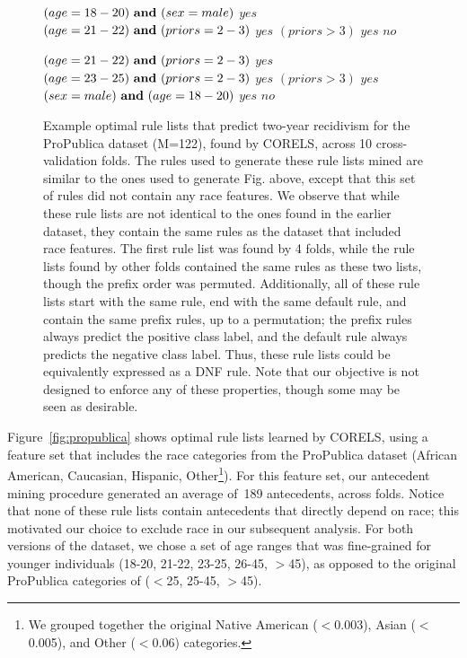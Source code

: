 \begin{figure}[hb!]
\vspace{1mm}
\begin{algorithmic}
\State \bif $(age = 18-20){\bf ~and~} (sex = male)$ \bthen $yes$
\State \belif $(age = 21-22) {\bf ~and~} (priors = 2-3)$ \bthen $yes$
\State \belif $(priors > 3)$ \bthen $yes$
\State \belse $no$
\end{algorithmic}
\vspace{1mm}
\begin{algorithmic}
\State \bif $(age = 21-22) {\bf ~and~} (priors = 2-3)$ \bthen $yes$
\State \bif $(age = 23-25) {\bf ~and~} (priors = 2-3)$ \bthen $yes$
\State \belif $(priors > 3)$ \bthen $yes$
\State \belif $(sex = male) {\bf ~and~} (age = 18-20)$ \bthen $yes$
\State \belse $no$
\end{algorithmic}
\caption{Example optimal rule lists that predict two-year recidivism for the
ProPublica dataset (M=122), found by CORELS, across 10 cross-validation folds.
%
The rules used to generate these rule lists mined are similar to the ones used to generate Fig. \label{fig:propublica} above, except that this set of rules did not contain any race features.
%
We observe that while these rule lists are not identical to the ones found in the earlier dataset, they contain
the same rules as the dataset that included race features.
%
The first rule list was found by 4 folds, while the rule lists found by other folds contained the same rules as these two lists, though the prefix order was permuted.
%
Additionally, all of these rule lists start with the same rule,
end with the same default rule, and contain the same prefix rules, up to a permutation;
the prefix rules always predict the positive class label,
and the default rule always predicts the negative class label.
%
Thus, these rule lists could be equivalently expressed as a DNF rule.
%
Note that our objective is not designed to enforce any of these properties,
though some may be seen as desirable.
}
\label{fig:recidivism-all-folds}
\end{figure}
%
Figure~\ref{fig:propublica} shows optimal rule lists learned by CORELS,
using a feature set that includes the race categories from the ProPublica dataset (African American, Caucasian, Hispanic,
Other\footnote{We grouped together the original Native American ($<$0.003), Asian ($<$0.005), and Other ($<$0.06) categories.}).
%
For this feature set, our antecedent mining procedure generated an average
of~189 antecedents, across folds.
%
Notice that none of these rule lists contain antecedents that directly depend on race;
this motivated our choice to exclude race in our subsequent analysis.
%
For both versions of the dataset, we chose a set of age ranges that was fine-grained
for younger individuals (18-20, 21-22, 23-25, 26-45, $>$45), as opposed to the original ProPublica categories of ($<$25, 25-45, $>$45).

